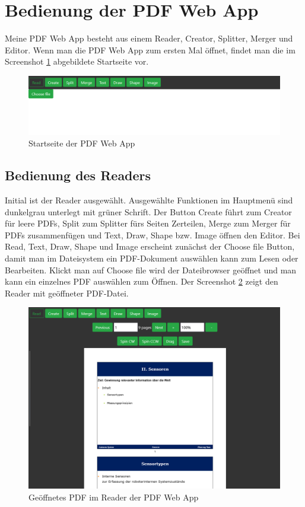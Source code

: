 \section{Bedienung der PDF Web App}
Meine PDF Web App besteht aus einem Reader, Creator, Splitter, Merger und Editor. Wenn man die PDF Web App zum ersten Mal öffnet, findet man die im Screenshot \ref{fig:start} abgebildete Startseite vor.

\begin{figure}[!htbp]
	\centering
	\includegraphics[width=1\textwidth]{"images/startseite.png"}
	\caption{Startseite der PDF Web App}
	\label{fig:start}
\end{figure}
\subsection{Bedienung des Readers}
Initial ist der Reader ausgewählt. Ausgewählte Funktionen im Hauptmenü sind dunkelgrau unterlegt mit grüner Schrift. Der Button Create führt zum Creator für leere PDFs, Split zum Splitter fürs Seiten Zerteilen, Merge zum Merger für PDFs zusammenfügen und Text, Draw, Shape bzw. Image öffnen den Editor. Bei Read, Text, Draw, Shape und Image erscheint zunächst der Choose file Button, damit man im Dateisystem ein PDF-Dokument auswählen kann zum Lesen oder Bearbeiten. Klickt man auf Choose file wird der Dateibrowser geöffnet und man kann ein einzelnes PDF auswählen zum Öffnen. Der Screenshot \ref{fig:reader} zeigt den Reader mit geöffneter PDF-Datei.

\begin{figure}[!htbp]
	\centering
	\includegraphics[width=1\textwidth]{"images/reader.png"}
	\caption{Geöffnetes PDF im Reader der PDF Web App}
	\label{fig:reader}
\end{figure}

